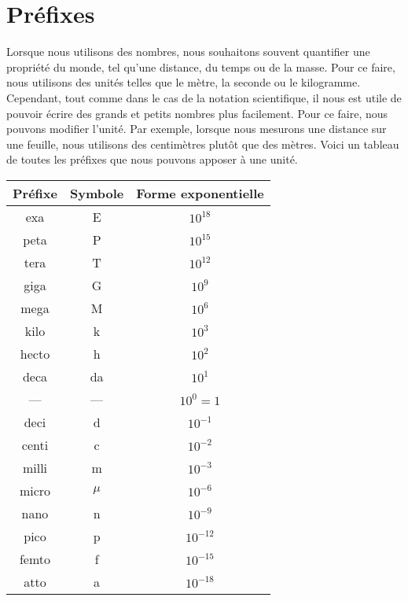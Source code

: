 
\section{Préfixes}

Lorsque nous utilisons des nombres, nous souhaitons souvent quantifier une propriété du monde, tel qu'une distance, du temps ou de la masse. Pour ce faire, nous utilisons des unités telles que le mètre, la seconde ou le kilogramme. Cependant, tout comme dans le cas de la notation scientifique, il nous est utile de pouvoir écrire des grands et petits nombres plus facilement. Pour ce faire, nous pouvons modifier l'unité. Par exemple, lorsque nous mesurons une distance sur une feuille, nous utilisons des centimètres plutôt que des mètres. Voici un tableau de toutes les préfixes que nous pouvons apposer à une unité.

\begin{table}[H]
	\centering
	\begin{tabular}{|c|c|c|}
	\hline
	\textbf{Préfixe} & \textbf{Symbole} & \textbf{Forme exponentielle} \\ \hline
	exa & E & $10^{18}$ \\ \hline
	peta & P & $10^{15}$ \\ \hline
	tera & T & $10^{12}$ \\ \hline
	giga & G & $10^{9}$ \\ \hline
	mega & M & $10^{6}$ \\ \hline
	kilo & k & $10^{3}$ \\ \hline
	hecto & h & $10^{2}$ \\ \hline
	deca & da & $10^{1}$ \\ \hline
	--- & --- & $10^{0} = 1$ \\ \hline
	deci & d & $10^{-1}$ \\ \hline
	centi & c & $10^{-2}$ \\ \hline
	milli & m & $10^{-3}$ \\ \hline
	micro & $\mu$ & $10^{-6}$ \\ \hline
	nano & n & $10^{-9}$ \\ \hline
	pico & p & $10^{-12}$ \\ \hline
	femto & f & $10^{-15}$ \\ \hline
	atto & a & $10^{-18}$ \\ \hline
	\end{tabular}
\end{table}